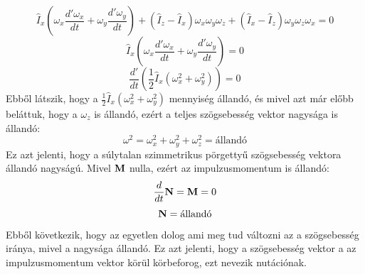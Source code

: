 \documentclass[../main.tex]{subfiles}
\begin{document}
\begin{equation}
    \hat{I}_x \left(\omega_x \frac{d'\omega_x}{dt} + \omega_y \frac{d'\omega_y}{dt}\right) + (\hat{I}_z - \hat{I}_x) \omega_x \omega_y \omega_z + (\hat{I}_x - \hat{I}_z) \omega_y \omega_z \omega_x = 0
\end{equation}
\begin{equation}
    \hat{I}_x \left(\omega_x \frac{d'\omega_x}{dt} + \omega_y \frac{d'\omega_y}{dt}\right) = 0
\end{equation}
\begin{equation}
    \frac{d'}{dt} \left(\frac{1}{2} \hat{I}_x (\omega_x^2 + \omega_y^2)\right) = 0
\end{equation}
Ebből látszik, hogy a $\frac{1}{2} \hat{I}_x (\omega_x^2 + \omega_y^2)$ mennyiség állandó, és mivel azt már előbb beláttuk, hogy a $\omega_z$ is állandó, ezért a teljes szögsebesség vektor nagysága is állandó:
\begin{equation}
    \omega^2 = \omega_x^2 + \omega_y^2 + \omega_z^2 = \text{állandó}
\end{equation}
Ez azt jelenti, hogy a súlytalan szimmetrikus pörgettyű szögsebesség vektora állandó nagyságú. Mivel $\bold{M}$ nulla, ezért az impulzusmomentum is állandó:
\begin{equation}
    \frac{d}{dt} \bold{N} = \bold{M} = 0
\end{equation}
\begin{equation}
    \bold{N} = \text{állandó}
\end{equation}
Ebből következik, hogy az egyetlen dolog ami meg tud változni az a szögsebesség iránya, mivel a nagysága állandó. Ez azt jelenti, hogy a szögsebesség vektor a az impulzusmomentum vektor körül körbeforog, ezt nevezik nutációnak.
\end{document}
